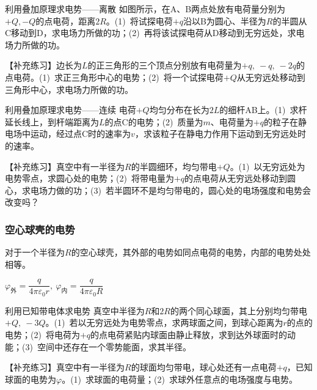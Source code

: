 
\begin{example}{利用叠加原理求电势——离散}
    如图所示，在A、B两点处放有电荷量分别为$+Q,-Q$的点电荷，距离$2R$。(1)~将试探电荷$+q$沿以B为圆心、半径为$R$的半圆从C移动到D，求电场力所做的功；(2)~再将该试探电荷从D移动到无穷远处，求电场力所做的功。
    \tcblower
    
    \tcbline
    【补充练习】边长为$L$的正三角形的三个顶点分别放有电荷量为$+q,~-q,~-2q$的点电荷。(1)~求正三角形中心的电势；(2)~将一个试探电荷$+Q$从无穷远处移动到三角形中心，求电场力所做的功。
\end{example}

\begin{example}{利用叠加原理求电势——连续}
    电荷$+Q$均匀分布在长为$2L$的细杆AB上。(1)~求杆延长线上，到杆端距离为$L$的点C的电势；(2)~质量为$m$、电荷量为$+q$的粒子在静电场中运动，经过点C时的速率为$v$，求该粒子在静电力作用下运动到无穷远处时的速率。
    \tcblower
    
    \tcbline
    【补充练习】真空中有一半径为$R$的半圆细环，均匀带电$+Q$。(1)~以无穷远处为电势零点，求圆心处的电势；(2)~将带电量为$+q$的点电荷从无穷远处移动到圆心，求电场力做的功；(3)~若半圆环不是均匀带电的，圆心处的电场强度和电势会改变吗？
\end{example}

\subsubsection{空心球壳的电势}

对于一个半径为$R$的空心球壳，其外部的电势如同点电荷的电势，内部的电势处处相等。

$\varphi_{\text{外}}=\dfrac{q}{4\pi\varepsilon_0r},~\varphi_{\text{内}}=\dfrac{q}{4\pi\varepsilon_0R}$

\begin{example}{利用已知带电体求电势}
    真空中半径为$R$和$2R$的两个同心球面，其上分别均匀带电$+Q,~-3Q$。(1)~若以无穷远处为电势零点，求两球面之间，到球心距离为$r$的点的电势；(2)~将电荷为$+q$的点电荷紧贴内球面由静止释放，求到达外球面时的动能；(3)~空间中还存在一个零势能面，求其半径。
    \tcblower

    \tcbline
    【补充练习】真空中有一半径为$R$的球面均匀带电，球心处还有一点电荷$+q$，已知球面的电势为$\varphi$。(1)~求球面的电荷量；(2)~求球外任意点的电场强度与电势。
    
\end{example}

